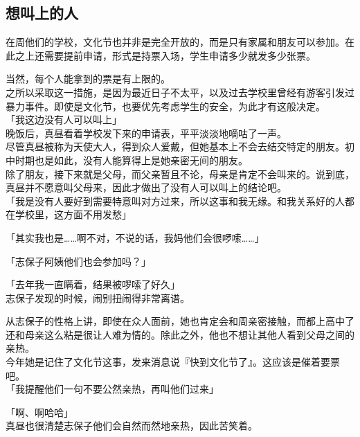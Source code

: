 \subsection{想叫上的人}

在周他们的学校，文化节也并非是完全开放的，而是只有家属和朋友可以参加。在此之上还需要提前申请，形式是持票入场，学生申请多少就发多少张票。

当然，每个人能拿到的票是有上限的。\\

之所以采取这一措施，是因为最近日子不太平，以及过去学校里曾经有游客引发过暴力事件。即使是文化节，也要优先考虑学生的安全，为此才有这般决定。\\

「我这边没有人可以叫上」\\

晚饭后，真昼看着学校发下来的申请表，平平淡淡地嘀咕了一声。\\

尽管真昼被称为天使大人，得到众人爱戴，但她基本上不会去结交特定的朋友。初中时期也是如此，没有人能算得上是她亲密无间的朋友。\\

除了朋友，接下来就是父母，而父亲暂且不论，母亲是肯定不会叫来的。说到底，真昼并不愿意叫父母来，因此才做出了没有人可以叫上的结论吧。\\

「我是没有人要好到需要特意叫对方过来，所以这事和我无缘。和我关系好的人都在学校里，这方面不用发愁」

「其实我也是……啊不对，不说的话，我妈他们会很啰嗦……」

「志保子阿姨他们也会参加吗？」

「去年我一直瞒着，结果被啰嗦了好久」\\

志保子发现的时候，闹别扭闹得非常离谱。

从志保子的性格上讲，即使在众人面前，她也肯定会和周亲密接触，而都上高中了还和母亲这么粘是很让人难为情的。除此之外，他也不想让其他人看到父母之间的亲热。\\

今年她是记住了文化节这事，发来消息说『快到文化节了』。这应该是催着要票吧。\\

「我提醒他们一句不要公然亲热，再叫他们过来」

「啊、啊哈哈」\\

真昼也很清楚志保子他们会自然而然地亲热，因此苦笑着。\\

